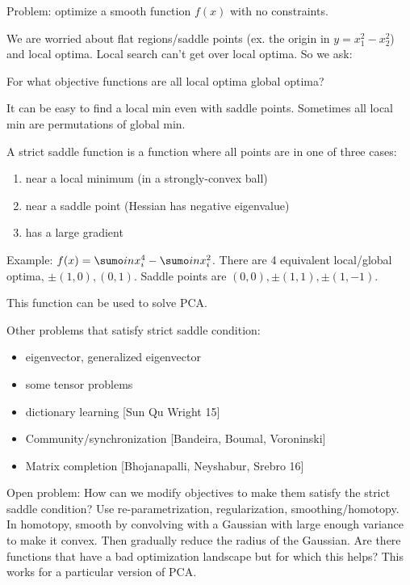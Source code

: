 Problem: optimize a smooth function $f(x)$ with no constraints.

We are worried about flat regions/saddle points (ex. the origin in $y=x_1^2-x_2^2$) and local optima. Local search can't get over local optima. So we ask:

For what objective functions are all local optima global optima?


It can be easy to find a local min even with saddle points. \cite{ge2015escaping} Sometimes all local min are permutations of global min.

A strict saddle function is a function where all points are in one of three cases:
\begin{enumerate}
\item
near a local minimum (in a strongly-convex ball)
\item
near a saddle point (Hessian has negative eigenvalue)
\item
has a large gradient
\end{enumerate}

Example: $f(x) = \sumo in x_i^4 - \sumo in x_i^2$.
There are 4 equivalent local/global optima, $\pm(1,0),(0,1)$. Saddle points are $(0,0), \pm(1,1), \pm (1,-1)$.

This function can be used to solve PCA.

Other problems that satisfy strict saddle condition: 
\begin{itemize}
\item
eigenvector, generalized eigenvector
\item
some tensor problems   \cite{ge2015escaping} 
\item
dictionary learning [Sun Qu Wright 15]
\item
Community/synchronization [Bandeira, Boumal, Voroninski]
\item
Matrix completion  \cite{ge2016matrix} [Bhojanapalli, Neyshabur, Srebro 16]
\end{itemize}

Open problem: How can we modify objectives to make them satisfy the strict saddle condition?
Use re-parametrization, regularization, smoothing/homotopy. In homotopy, smooth by convolving with a Gaussian with large enough variance to make it convex. Then gradually reduce the radius of the Gaussian. Are there functions that have a bad optimization landscape but for which this helps? This works for a particular version of PCA.


